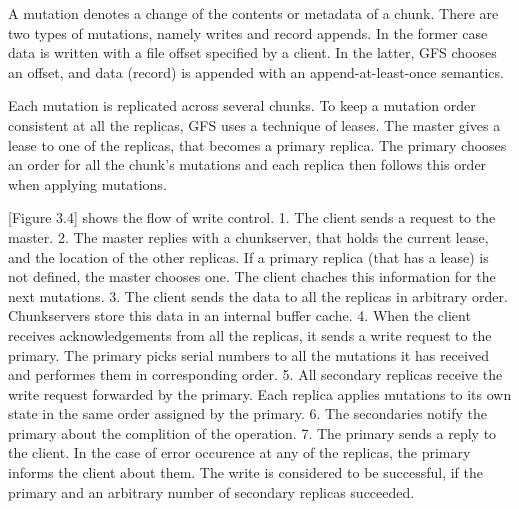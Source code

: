 A mutation denotes a change of the contents or metadata of a chunk.
There are two types of mutations, namely writes and record appends.
In the former case data is written with a file offset specified by a client.
In the latter, GFS chooses an offset, and data (record) is appended with an append-at-least-once semantics.

Each mutation is replicated across several chunks.
To keep a mutation order consistent at all the replicas, GFS uses a technique of leases.
The master gives a lease to one of the replicas, that becomes a primary replica.
The primary chooses an order for all the chunk's mutations and each replica then follows this order when applying mutations.

[Figure 3.4] shows the flow of write control.
1. The client sends a request to the master.
2. The master replies with a chunkserver, that holds the current lease, and the location of the other replicas.
If a primary replica (that has a lease) is not defined, the master chooses one. 
The client chaches this information for the next mutations.
3. The client sends the data to all the replicas in arbitrary order.
Chunkservers store this data in an internal buffer cache. 
4. When the client receives acknowledgements from all the replicas, it sends a write request to the primary.
The primary picks serial numbers to all the mutations it has received and performes them in corresponding order.
5. All secondary replicas receive the write request forwarded by the primary.
Each replica applies mutations to its own state in the same order assigned by the primary.
6. The secondaries notify the primary about the complition of the operation.
7. The primary sends a reply to the client.
In the case of error occurence at any of the replicas, the primary informs the client about them.
The write is considered to be successful, if the primary and an arbitrary number of secondary replicas succeeded.



	